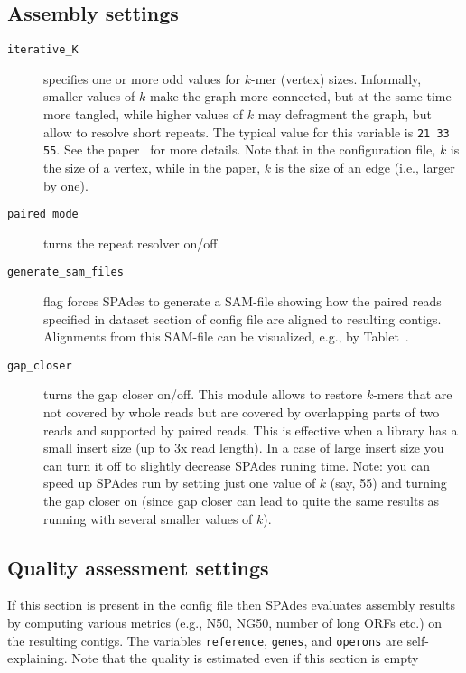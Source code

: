 \documentclass{article}
\def\spades{SPAdes}
\begin{document}
\subsection{Assembly settings}\label{subsec:assembly}
\begin{description}
\item[{\tt iterative\_K}] specifies one or more odd values for $k$-mer (vertex) sizes.  Informally, smaller values of $k$ make the graph more connected,
but at the same time more tangled, while higher values of $k$ may defragment the graph, but allow to resolve short repeats.
The typical value for this variable is {\tt 21 33 55}. See the paper~\cite{main} for more details.
Note that in the configuration file, $k$ is the size of a vertex, while in the paper, $k$ is the size of an edge (i.e., larger by one).

\item[{\tt paired\_mode}] turns the repeat resolver on/off.

\item[{\tt generate\_sam\_files}] flag forces {\spades} to generate a SAM-file
showing how the paired reads specified in dataset section of config file are aligned to resulting contigs.  Alignments from this SAM-file
can be visualized, e.g., by Tablet~\cite{tablet}.

\item[{\tt gap\_closer}] turns the gap closer on/off. This module allows to restore $k$-mers that are not covered by whole reads
but are covered by overlapping parts of two reads and supported by paired reads. This is effective when a library has a small insert size (up to 3x read length). In a case of large insert size you can turn it off to slightly decrease SPAdes runing time.
Note: you can speed up {\spades} run by setting just one value of $k$ (say, 55) and turning the gap closer on
(since gap closer can lead to quite the same results as running with several smaller values of $k$).
\end{description}

\subsection{Quality assessment settings}
If this section is present in the config file then
{\spades} evaluates assembly results by computing various metrics (e.g., N50, NG50, number of long ORFs etc.) on the resulting contigs.
The variables {\tt reference}, {\tt genes}, and {\tt operons} are self-explaining.
Note that the quality is estimated even if this section is empty
\end{document}
